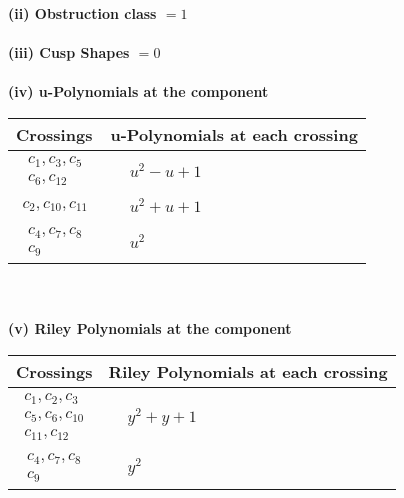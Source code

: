 \documentclass[1p]{elsarticle_modified}
\theoremstyle{definition}
\begin{document}
\flushleft \textbf{(ii) Obstruction class $= 1$}\\~\\
\flushleft \textbf{(iii) Cusp Shapes $= 0$}\\~\\
\newpage\renewcommand{\arraystretch}{1}
\flushleft \textbf{(iv) u-Polynomials at the component}\newline \\
\begin{tabular}{m{50pt}|m{274pt}}
Crossings & \hspace{64pt}u-Polynomials at each crossing \\
\hline $$\begin{aligned}c_{1},c_{3},c_{5}\\c_{6},c_{12}\end{aligned}$$&$\begin{aligned}
&u^2- u+1
\end{aligned}$\\
\hline $$\begin{aligned}c_{2},c_{10},c_{11}\end{aligned}$$&$\begin{aligned}
&u^2+u+1
\end{aligned}$\\
\hline $$\begin{aligned}c_{4},c_{7},c_{8}\\c_{9}\end{aligned}$$&$\begin{aligned}
&u^2
\end{aligned}$\\
\hline
\end{tabular}\\~\\
\newpage\renewcommand{\arraystretch}{1}
\flushleft \textbf{(v) Riley Polynomials at the component}\newline \\
\begin{tabular}{m{50pt}|m{274pt}}
Crossings & \hspace{64pt}Riley Polynomials at each crossing \\
\hline $$\begin{aligned}c_{1},c_{2},c_{3}\\c_{5},c_{6},c_{10}\\c_{11},c_{12}\end{aligned}$$&$\begin{aligned}
&y^2+y+1
\end{aligned}$\\
\hline $$\begin{aligned}c_{4},c_{7},c_{8}\\c_{9}\end{aligned}$$&$\begin{aligned}
&y^2
\end{aligned}$\\
\hline
\end{tabular}\\~\\
\end{document}
